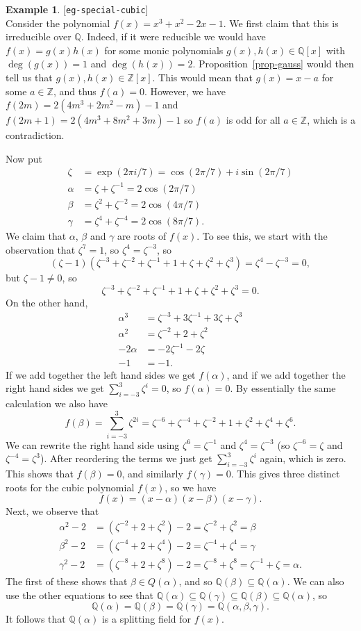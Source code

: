 \documentclass{amsart}
\newcommand{\lbl}[1]{\label{#1}\textup{[\texttt{#1}]}\ \\}
\newcommand{\lbl}{\label}
\newcommand{\Z}         {{\mathbb{Z}}}
\newcommand{\Q}         {{\mathbb{Q}}}
\newcommand{\al}        {\alpha}
\newcommand{\bt}        {\beta}
\newcommand{\gm}        {\gamma}
\newcommand{\zt}        {\zeta}
\newcommand{\sse}       {\subseteq}
\renewcommand{\:}{\colon}
\theoremstyle{definition}
\newtheorem{example}[theorem]{Example}
\begin{document}
\begin{example}\lbl{eg-special-cubic}
 Consider the polynomial $f(x)=x^3+x^2-2x-1$.  We first claim that
 this is irreducible over $\Q$.  Indeed, if it were reducible we would
 have $f(x)=g(x)h(x)$ for some monic polynomials $g(x),h(x)\in\Q[x]$
 with $\deg(g(x))=1$ and $\deg(h(x))=2$.  Proposition~\ref{prop-gauss}
 would then tell us that $g(x),h(x)\in\Z[x]$.  This would mean that
 $g(x)=x-a$ for some $a\in\Z$, and thus $f(a)=0$.  However, we have
 $f(2m)=2(4m^3+2m^2-m)-1$ and $f(2m+1)=2(4m^3+8m^2+3m)-1$ so $f(a)$ is
 odd for all $a\in\Z$, which is a contradiction.  

 Now put 
 \begin{align*}
  \zt &= \exp(2\pi i/7) = \cos(2\pi/7) + i\sin(2\pi/7) \\
  \al &= \zt   + \zt^{-1} = 2\cos(2\pi/7) \\
  \bt &= \zt^2 + \zt^{-2} = 2\cos(4\pi/7) \\
  \gm &= \zt^4 + \zt^{-4} = 2\cos(8\pi/7).
 \end{align*}
 We claim that $\al$, $\bt$ and $\gm$ are roots of $f(x)$.  To see
 this, we start with the observation that $\zt^7=1$, so
 $\zt^4=\zt^{-3}$, so  
 \[ (\zt-1)(\zt^{-3}+\zt^{-2}+\zt^{-1}+1+\zt+\zt^2+\zt^3) = \zt^4-\zt^{-3}=0, \]
 but $\zt-1\neq 0$, so 
 \[ \zt^{-3}+\zt^{-2}+\zt^{-1}+1+\zt+\zt^2+\zt^3 = 0. \]
 On the other hand, 
 \begin{align*}
  \al^3 &= \zt^{-3} + 3\zt^{-1} + 3\zt + \zt^3 \\
  \al^2 &= \zt^{-2} + 2 + \zt^2 \\
  -2\al &= -2\zt^{-1}-2\zt \\
  -1    &= -1.
 \end{align*}
 If we add together the left hand sides we get $f(\al)$, and if we add
 together the right hand sides we get $\sum_{i=-3}^3\zt^i=0$, so
 $f(\al)=0$.  By essentially the same calculation we also have 
 \[ f(\bt)=\sum_{i=-3}^3\zt^{2i} = 
     \zt^{-6}+\zt^{-4}+\zt^{-2}+1+\zt^2+\zt^4+\zt^6.
 \]
 We can rewrite the right hand side using $\zt^6=\zt^{-1}$ and
 $\zt^4=\zt^{-3}$ (so $\zt^{-6}=\zt$ and $\zt^{-4}=\zt^3$).  After
 reordering the terms we just get $\sum_{i=-3}^3\zt^i$ again, which is
 zero.  This shows that $f(\bt)=0$, and similarly $f(\gm)=0$.  This
 gives three distinct roots for the cubic polynomial $f(x)$, so we
 have 
 \[ f(x) = (x-\al)(x-\bt)(x-\gm). \]
 Next, we observe that 
 \begin{align*}
  \al^2-2 &= (\zt^{-2}+2+\zt^2)-2 = \zt^{-2}+\zt^2 = \bt \\
  \bt^2-2 &= (\zt^{-4}+2+\zt^4)-2 = \zt^{-4}+\zt^4 = \gm \\
  \gm^2-2 &= (\zt^{-8}+2+\zt^8)-2 = \zt^{-8}+\zt^8 = \zt^{-1}+\zt = \al.
 \end{align*}
 The first of these shows that $\bt\in Q(\al)$, and so
 $\Q(\bt)\sse\Q(\al)$.  We can also use the other equations to see
 that $\Q(\al)\sse\Q(\gm)\sse\Q(\bt)\sse\Q(\al)$, so 
 \[ \Q(\al) = \Q(\bt) = \Q(\gm) = \Q(\al,\bt,\gm). \]
 It follows that $\Q(\al)$ is a splitting field for $f(x)$.


\end{example}
\end{document}
